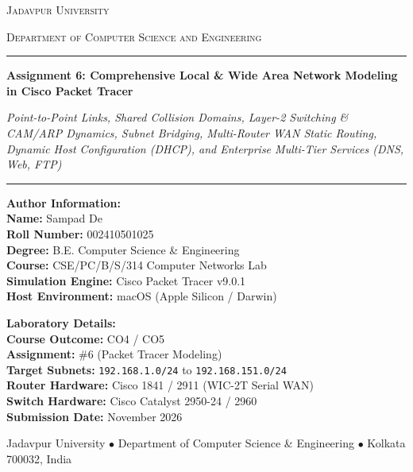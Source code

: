 \documentclass[11pt,a4paper]{article}
\begin{document}
\begin{titlepage}
    \centering
    \vspace*{1.0cm}
    
    {\Large\scshape Jadavpur University \par}
    \vspace{0.3cm}
    {\normalsize\scshape Department of Computer Science and Engineering\par}
    \vspace{1.0cm}
    
    \rule{\textwidth}{1.3pt}\par
    \vspace{0.45cm}
    {\huge\bfseries Assignment 6: Comprehensive Local \& Wide Area Network Modeling in Cisco Packet Tracer \par}
    \vspace{0.35cm}
    {\Large\itshape Point-to-Point Links, Shared Collision Domains, Layer-2 Switching \& CAM/ARP Dynamics, Subnet Bridging, Multi-Router WAN Static Routing, Dynamic Host Configuration (DHCP), and Enterprise Multi-Tier Services (DNS, Web, FTP) \par}
    \vspace{0.45cm}
    \rule{\textwidth}{1.3pt}\par
    
    \vspace{2.0cm}
    
    \begin{minipage}[t]{0.48\textwidth}
        \textbf{Author Information:}\\
        \textbf{Name:} Sampad De\\
        \textbf{Roll Number:} 002410501025\\
        \textbf{Degree:} B.E. Computer Science \& Engineering\\
        \textbf{Course:} CSE/PC/B/S/314 Computer Networks Lab\\
        \textbf{Simulation Engine:} Cisco Packet Tracer v9.0.1\\
        \textbf{Host Environment:} macOS (Apple Silicon / Darwin)
    \end{minipage}
    \hfill
    \begin{minipage}[t]{0.48\textwidth}
        \raggedleft
        \textbf{Laboratory Details:}\\
        \textbf{Course Outcome:} CO4 / CO5\\
        \textbf{Assignment:} \#6 (Packet Tracer Modeling)\\
        \textbf{Target Subnets:} \texttt{192.168.1.0/24} to \texttt{192.168.151.0/24}\\
        \textbf{Router Hardware:} Cisco 1841 / 2911 (WIC-2T Serial WAN)\\
        \textbf{Switch Hardware:} Cisco Catalyst 2950-24 / 2960\\
        \textbf{Submission Date:} November 2026
    \end{minipage}
    
    \vfill
    {\footnotesize Jadavpur University $\bullet$ Department of Computer Science \& Engineering $\bullet$ Kolkata 700032, India}
\end{titlepage}
\end{document}
